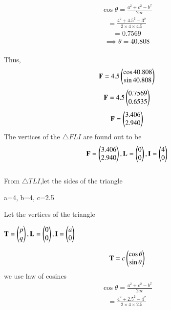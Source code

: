 \documentclass[journal,12pt,twocolumn]{IEEEtran}
\begin{document}
\begin{align}
   \cos\theta=\frac{a^2+c^2-b^2}{2ac}
\end{align}
\begin{align}
    =\frac{4^2+4.5^2-3^2}{2\times4\times4.5}
\end{align}
\begin{align}
     =0.7569
\end{align}
\begin{align}
    \implies \theta=40.808
\end{align}
\\Thus,
\begin{align}
   \mathbf{F}=4.5\begin{pmatrix}\cos40.808\\\sin40.808\end{pmatrix} 
\end{align}
\begin{align}
    \mathbf{F}=4.5\begin{pmatrix}0.7569\\0.6535\end{pmatrix} 
\end{align}
\begin{align}
    \mathbf{F}=\begin{pmatrix}3.406\\2.940\end{pmatrix} 
\end{align}
The vertices of the $\triangle FLI$ are found out to be\\
\begin{align}
    \mathbf{F}=\begin{pmatrix}3.406\\2.940\end{pmatrix}, \mathbf{L}=\begin{pmatrix}0\\0\end{pmatrix}, \mathbf{I}=\begin{pmatrix}4\\0\end{pmatrix}
\end{align}
\\From $\triangle TLI$,let the sides of the triangle
\begin{center}
   a=4, b=4, c=2.5 
\end{center}
Let the vertices of the triangle 
\begin{center}
   $\mathbf{T}=\begin{pmatrix}p\\q\end{pmatrix}, \mathbf{L}=\begin{pmatrix}0\\0\end{pmatrix}, \mathbf{I}=\begin{pmatrix}a\\0\end{pmatrix}$ 
\end{center}
\begin{align}
    \mathbf{T}=c\begin{pmatrix}\cos \theta\\\sin \theta\end{pmatrix}
\end{align}
 we use law of cosines
\begin{align}
   \cos\theta=\frac{a^2+c^2-b^2}{2ac}
\end{align}
\begin{align}
    =\frac{4^2+2.5^2-4^2}{2\times4\times2.5}
\end{align}
\end{document}
